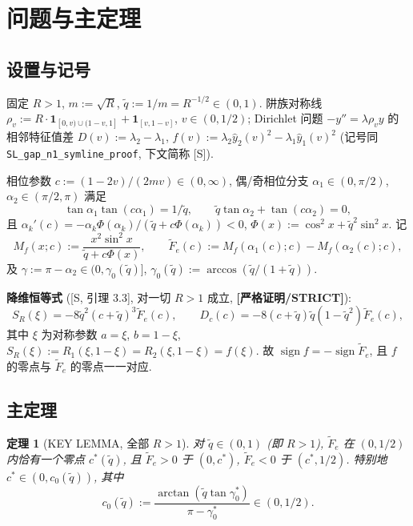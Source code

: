 \documentclass[UTF8]{ctexart}
\newtheorem{theorem}{定理}[section]
\newcommand{\STRICT}{\textbf{[严格证明/STRICT]}}
\begin{document}
\section{问题与主定理}\label{sec:main}

\subsection{设置与记号}

固定 $R>1$, $m:=\sqrt R$, $\tilde q:=1/m=R^{-1/2}\in(0,1)$. 阱族对称线
$\rho_v:=R\cdot\mathbf1_{[0,v)\cup(1-v,1]}+\mathbf1_{[v,1-v]}$, $v\in(0,1/2)$;
Dirichlet 问题 $-y''=\lambda\rho_v y$ 的相邻特征值差 $D(v):=\lambda_2-\lambda_1$,
$f(v):=\lambda_2\hat y_2(v)^2-\lambda_1\hat y_1(v)^2$ (记号同
\texttt{SL\_gap\_n1\_symline\_proof}, 下文简称 [S]).

相位参数 $c:=(1-2v)/(2mv)\in(0,\infty)$, 偶/奇相位分支
$\alpha_1\in(0,\pi/2)$, $\alpha_2\in(\pi/2,\pi)$ 满足
\begin{equation}
	\tan\alpha_1\tan(c\alpha_1)=1/\tilde q,
	\qquad \tilde q\tan\alpha_2+\tan(c\alpha_2)=0,
	\label{eq:secular}
\end{equation}
且 $\alpha_k'(c)=-\alpha_k\Phi(\alpha_k)/(\tilde q+c\Phi(\alpha_k))<0$,
$\Phi(x):=\cos^2x+\tilde q^2\sin^2x$. 记
\begin{equation}
	M_f(x;c):=\frac{x^2\sin^2x}{\tilde q+c\Phi(x)},\qquad
	\widetilde F_e(c):=M_f(\alpha_1(c);c)-M_f(\alpha_2(c);c),
	\label{eq:Fe}
\end{equation}
及 $\gamma:=\pi-\alpha_2\in(0,\gamma_0(\tilde q)]$, $\gamma_0(\tilde q):=
\arccos(\tilde q/(1+\tilde q))$.

\textbf{降维恒等式} ([S, 引理 3.3], 对一切 $R>1$ 成立, \STRICT):
\begin{equation}
	S_R(\xi)=-8\tilde q^2(c+\tilde q)^3\widetilde F_e(c),
	\qquad
	D_c(c)=-8(c+\tilde q)\tilde q(1-\tilde q^2)\widetilde F_e(c),
	\label{eq:dimred}
\end{equation}
其中 $\xi$ 为对称参数 $a=\xi$, $b=1-\xi$, $S_R(\xi):=R_1(\xi,1-\xi)=R_2(\xi,1-\xi)=f(\xi)$.
故 $\operatorname{sign} f=-\operatorname{sign}\widetilde F_e$, 且 $f$ 的零点与
$\widetilde F_e$ 的零点一一对应.

\subsection{主定理}

\begin{theorem}[KEY LEMMA, 全部 $R>1$]\label{thm:main}
对 $\tilde q\in(0,1)$ (即 $R>1$), $\widetilde F_e$ 在 $(0,1/2)$ 内恰有一个零点
$c^*(\tilde q)$, 且 $\widetilde F_e>0$ 于 $(0,c^*)$, $\widetilde F_e<0$ 于
$(c^*,1/2)$. 特别地 $c^*\in(0,c_0(\tilde q))$, 其中
\begin{equation}
	c_0(\tilde q):=\frac{\arctan(\tilde q\tan\gamma_0^*)}{\pi-\gamma_0^*}\in(0,1/2).
	\label{eq:c0}
\end{equation}
\end{theorem}
\end{document}
